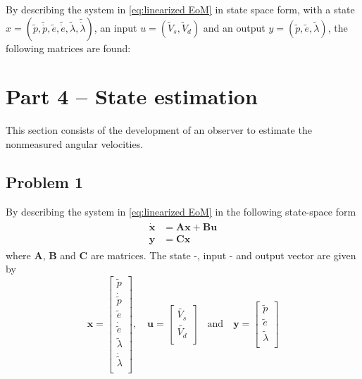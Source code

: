 

By describing the system in \cref{eq:linearized EoM} in state space form, with a state $x = (\tilde{p}, \tilde{\dot{p}}, \tilde{e}, \tilde{\dot{e}}, \tilde{\lambda}, \tilde{\dot{\lambda}})$, an input $u = (\tilde{V}_s, \tilde{V}_d)$ and an output $y = (\tilde{p}, \tilde{e}, \tilde{\lambda})$, the following matrices are found:

\section{Part 4 -- State estimation}
This section consists of the development of an observer to estimate the
nonmeasured angular velocities.
\subsection{Problem 1}
By describing the system in \cref{eq:linearized EoM} in the following state-space form
\begin{align}
  \begin{split}
    \dot{\bm{x}} &= \bm{Ax} + \bm{Bu} \\
    \bm{y} &= \bm{Cx}
  \end{split}
\end{align}
where  $\bm{A}$, $\bm{B}$ and $\bm{C}$ are matrices. The state -,
input - and output vector are given by
\begin{equation}
  \label{eq:state_space_vectors}
  \bm{x} =
  \begin{bmatrix}
    \tilde{p} \\
    \dot{\tilde{p}} \\
    \tilde{e} \\
    \dot{\tilde{e}} \\
    \tilde{\lambda} \\
    \dot{\tilde{\lambda}} \\
  \end{bmatrix}
  , \quad \bm{u} =
  \begin{bmatrix}
    \tilde{V_s} \\
    \tilde{V_d} \\
  \end{bmatrix}
  \quad \text{and} \quad \bm{y} =
  \begin{bmatrix}
    \tilde{p} \\
    \tilde{e} \\
    \tilde{\lambda}\\
  \end{bmatrix}
\end{equation}

